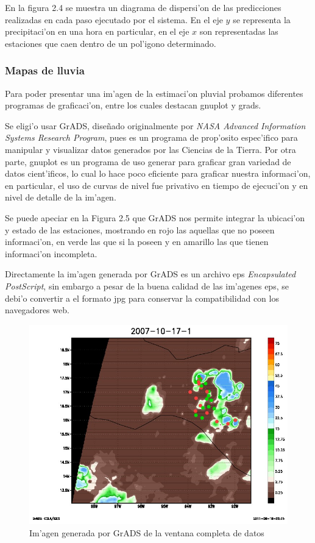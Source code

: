 En la figura 2.4 se muestra un diagrama de dispersi'on de las predicciones realizadas en cada paso ejecutado por el sistema.
En el eje ${y}$ se representa la precipitaci'on en una hora en particular, 
en el eje $x$ son representadas las estaciones que caen dentro de un pol'igono
determinado. 


\subsubsection*{Mapas de lluvia}

Para poder presentar una im'agen de la estimaci'on pluvial probamos diferentes programas de graficaci'on, entre los cuales
destacan gnuplot y grads.

Se eligi'o usar GrADS, dise\~nado originalmente por \textit{ NASA Advanced Information Systems Research Program}, 
pues es un programa de prop'osito espec'ifico para manipular y visualizar datos generados por las Ciencias 
de la Tierra. Por otra parte, gnuplot es un programa de uso generar para graficar gran variedad de datos cient'ificos, lo cual
lo hace poco eficiente para graficar nuestra informaci'on, en particular, el uso de curvas de nivel fue privativo en tiempo
de ejecuci'on y en nivel de detalle de la im'agen.

Se puede apeciar en la Figura 2.5 que GrADS nos permite integrar la ubicaci'on y estado de las estaciones,
mostrando en rojo las aquellas que no poseen informaci'on, en verde las que si la poseen y en amarillo las que 
tienen informaci'on incompleta.

Directamente la im'agen generada por GrADS es un archivo eps \textit{Encapsulated PostScript}, sin embargo a pesar de la buena calidad
de las im'agenes eps, se debi'o convertir a el formato jpg para conservar la compatibilidad con los navegadores web.

\begin{figure}[h!]
 \centering
 \includegraphics[width=130mm]{./imagenes/2007_10_17_1.jpg}
 \caption{Im'agen generada por GrADS de la ventana completa de datos}
\end{figure}

